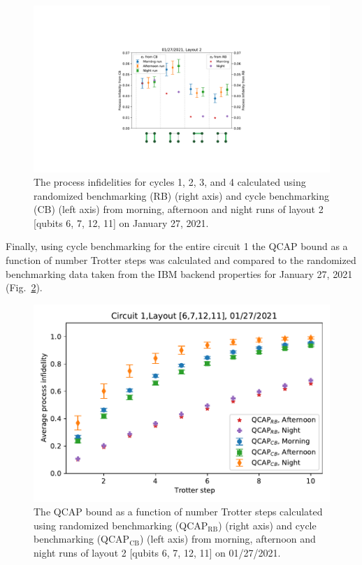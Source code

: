 \begin{figure}[htpb]
    \includegraphics[scale=0.56]{ProcessInfidelitiesCB_RB_plots_27_morning_afternoon_night_L2.pdf}
    \caption{The process infidelities for cycles  1, 2, 3, and 4 calculated using randomized benchmarking (RB) (right axis) and cycle benchmarking (CB) (left axis) from morning, afternoon and night runs of layout 2 [qubits 6, 7, 12, 11] on January 27, 2021.}
    \label{fig:processinfidelitiesStory6}
\end{figure}

Finally, using cycle benchmarking for the entire circuit 1 the QCAP bound as a function of number Trotter steps was calculated and compared to the randomized benchmarking data taken from the IBM backend properties for January 27, 2021 (Fig.~\ref{fig:QCAPCB_RB_Story6}).

\begin{figure}[htpb]
    \includegraphics[scale=0.56]{QCAP_CB_RB_Data_01_27_2021_Layout_2C1.pdf}
    \caption{The QCAP bound as a function of number Trotter steps calculated using randomized benchmarking (QCAP$_{\text{RB}}$) (right axis) and cycle benchmarking (QCAP$_{\text{CB}}$) (left axis) from morning, afternoon and night runs of layout 2 [qubits 6, 7, 12, 11] on  01/27/2021.}
    \label{fig:QCAPCB_RB_Story6}
\end{figure}

